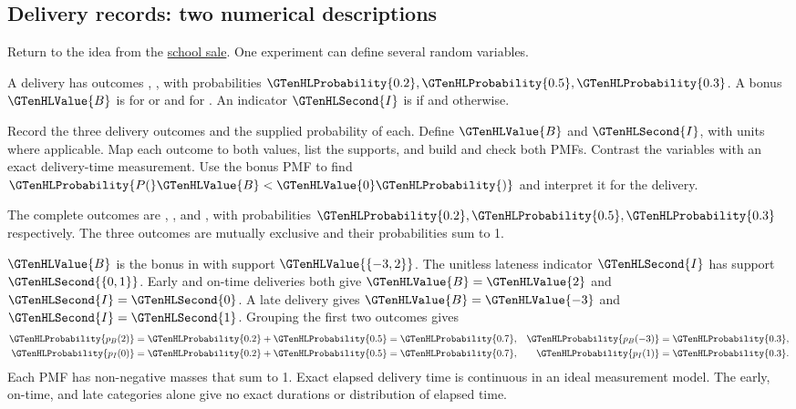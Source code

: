 \subsection{Delivery records: two numerical descriptions}
\label{subsec:t2-c1-delivery-records-two-numerical-descriptions}
Return to the idea from the \hyperref[subsec:t2-c1-independent-outcomes]{school sale}. One experiment can define several random variables.

A delivery has outcomes , ,  with probabilities $\GTenHLProbability{0.2},\GTenHLProbability{0.5},\GTenHLProbability{0.3}$. A bonus $\GTenHLValue{B}$ is  for  or  and  for . An indicator $\GTenHLSecond{I}$ is  if  and  otherwise.

    {Record the three delivery outcomes and the supplied probability of each.}
    {Define $\GTenHLValue{B}$ and $\GTenHLSecond{I}$, with units where applicable. Map each outcome to both values, list the supports, and build and check both PMFs. Contrast the variables with an exact delivery-time measurement.}
    {Use the bonus PMF to find $\GTenHLProbability{P(}\GTenHLValue{B}<\GTenHLValue{0}\GTenHLProbability{)}$ and interpret it for the delivery.}

The complete outcomes are , , and , with probabilities $\GTenHLProbability{0.2},\GTenHLProbability{0.5},\GTenHLProbability{0.3}$ respectively. The three outcomes are mutually exclusive and their probabilities sum to 1.

$\GTenHLValue{B}$ is the bonus in  with support $\GTenHLValue{\{-3,2\}}$. The unitless lateness indicator $\GTenHLSecond{I}$ has support $\GTenHLSecond{\{0,1\}}$. Early and on-time deliveries both give $\GTenHLValue{B}=\GTenHLValue{2}$ and $\GTenHLSecond{I}=\GTenHLSecond{0}$. A late delivery gives $\GTenHLValue{B}=\GTenHLValue{-3}$ and $\GTenHLSecond{I}=\GTenHLSecond{1}$. Grouping the first two outcomes gives
\[
\begin{aligned}
\GTenHLProbability{p_{B}(2)}&=\GTenHLProbability{0.2}+\GTenHLProbability{0.5}=\GTenHLProbability{0.7},
& \GTenHLProbability{p_{B}(-3)}&=\GTenHLProbability{0.3},\\
\GTenHLProbability{p_{I}(0)}&=\GTenHLProbability{0.2}+\GTenHLProbability{0.5}=\GTenHLProbability{0.7},
& \GTenHLProbability{p_{I}(1)}&=\GTenHLProbability{0.3}.
\end{aligned}
\]
Each PMF has non-negative masses that sum to 1. Exact elapsed delivery time is continuous in an ideal measurement model. The early, on-time, and late categories alone give no exact durations or distribution of elapsed time.

